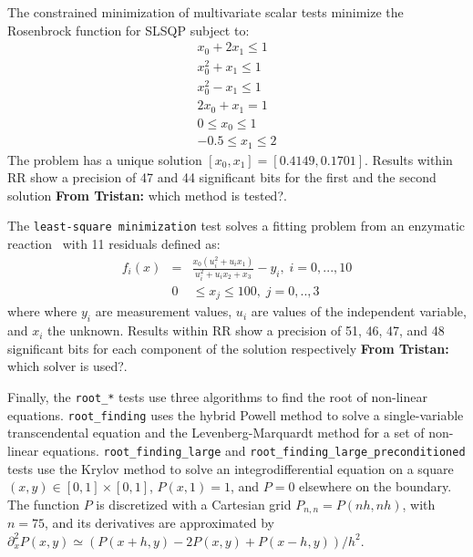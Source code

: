 \documentclass[11pt]{article}
\newcommand{\tristan}[1]{\color{orange}\textbf{From Tristan:} #1\color{black}\xspace}
\begin{document}
The constrained minimization of multivariate scalar tests minimize the Rosenbrock function for SLSQP subject to:
\begin{eqnarray*}
    x_0 + 2x_1 \leq 1 \\
    x_0^2 + x_1 \leq 1 \\
    x_0^2 - x_1 \leq 1 \\
    2x_0 + x_1 = 1 \\
    0 \leq x_0 \leq 1 \\
    -0.5 \leq x_1 \leq 2 
\end{eqnarray*}
The problem has a unique solution $[x_0, x_1] = [0.4149, 0.1701]$.
Results within RR show a precision of 47 and 44 significant bits for the first and the second solution \tristan{which method is tested?}.

The \texttt{least-square minimization} test solves a fitting problem from an enzymatic reaction~\cite{kowalik1968analysis} with 11 residuals defined as:
\begin{eqnarray*}
f_i(x) &=& \frac{x_0(u_i^2 + u_ix_1)}{u_i^2 + u_ix_2+x_3}-y_i,\; i=0,...,10 \\
&0& \leq x_j \leq 100,\; j=0,..,3
\end{eqnarray*}
where where $y_i$ are measurement values, $u_i$ are values of the independent variable, and
$x_i$ the unknown.
Results within RR show a precision of 51, 46, 47, and 48 significant bits for each component of the solution respectively \tristan{which solver is used?}.

Finally, the \texttt{root\_*} tests use three algorithms to 
find the root of non-linear equations. \texttt{root\_finding}
uses the hybrid Powell method to solve a single-variable transcendental equation and 
the Levenberg-Marquardt method for a set of non-linear equations. 
\texttt{root\_finding\_large} and \texttt{root\_finding\_large\_preconditioned} tests use 
the Krylov method to solve an integrodifferential equation on a square
 $(x,y) \in [0,1] \times [0,1]$, $P(x,1)=1$, and $P=0$ elsewhere on the boundary.
The function $P$ is discretized with a Cartesian grid $P_{n,n}=P(nh,nh)$, with $n=75$, and its derivatives are approximated by $\partial_x^2P(x,y) \simeq (P(x+h,y) - 2P(x,y) + P(x-h,y))/h^2$.

\end{document}
